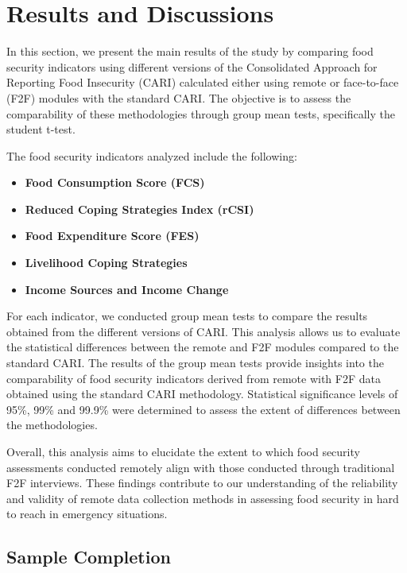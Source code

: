 \documentclass[11pt,harvard]{article}
\begin{document}
	
\pagebreak
	
\section{Results and Discussions}
	
In this section, we present the main results of the study by comparing food security indicators using different versions of the Consolidated Approach for Reporting Food Insecurity (CARI) calculated either using remote or face-to-face (F2F) modules with the standard CARI. The objective is to assess the comparability of these methodologies through group mean tests, specifically the student t-test.

The food security indicators analyzed include the following:
\begin{itemize}[label=--, left=2.75em]
	\item[1.]\textbf{Food Consumption Score (FCS)}
	\item[2.]\textbf{Reduced Coping Strategies Index (rCSI)}
	\item[3.]\textbf{Food Expenditure Score (FES)}
	\item[4.]\textbf{Livelihood Coping Strategies}
	\item[5.]\textbf{Income Sources and Income Change}
\end{itemize}
For each indicator, we conducted group mean tests to compare the results obtained from the different versions of CARI. This analysis allows us to evaluate the statistical differences between the remote and F2F modules compared to the standard CARI. The results of the group mean tests provide insights into the comparability of food security indicators derived from remote with F2F data obtained using the standard CARI methodology. Statistical significance levels of 95\%, 99\% and 99.9\% were determined to assess the extent of differences between the methodologies.

Overall, this analysis aims to elucidate the extent to which food security assessments conducted remotely align with those conducted through traditional F2F interviews. These findings contribute to our understanding of the reliability and validity of remote data collection methods in assessing food security in hard to reach in emergency situations.

\subsection{Sample Completion}
\end{document}
